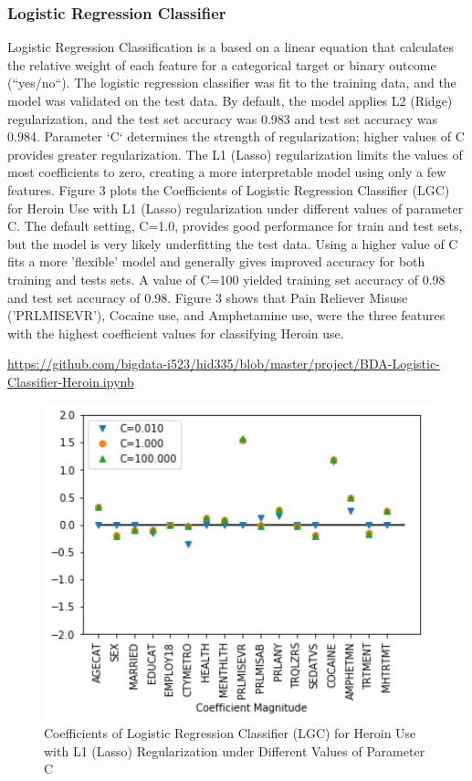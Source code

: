 \documentclass[sigconf]{acmart}
\begin{document}
\subsubsection{Logistic Regression Classifier}
Logistic Regression Classification is a based on a linear equation that 
calculates the relative weight of each feature for a categorical target or 
binary outcome (``yes/no``). The logistic regression classifier was fit to 
the training data, and the model was validated on the test data. By default, 
the model applies L2 (Ridge) regularization, and the test set accuracy 
was 0.983 and test set accuracy was 0.984. Parameter `C` determines the 
strength of regularization; higher values of C provides greater regularization. 
The L1 (Lasso) regularization limits the values of most coefficients to zero, 
creating a more interpretable model using only a few features. Figure 3 plots 
the Coefficients of Logistic Regression Classifier (LGC) for Heroin Use with 
L1 (Lasso) regularization under different values of parameter C. The default 
setting, C=1.0, provides good performance for train and test sets, but the 
model is very likely underfitting the test data. Using a higher value of C 
fits a more 'flexible' model and generally gives improved accuracy for both 
training and tests sets. A value of C=100 yielded training set accuracy of
0.98 and test set accuracy of 0.98. Figure 3 shows that Pain Reliever Misuse
('PRLMISEVR'), Cocaine use, and Amphetamine use, were the three features
with the highest coefficient values for classifying Heroin use. 

\url{https://github.com/bigdata-i523/hid335/blob/master/project/BDA-Logistic-Classifier-Heroin.ipynb}

\begin{figure}[!ht]
  \centering\includegraphics[width=\columnwidth]{images/Figure3.pdf}
  \caption{Coefficients of Logistic Regression Classifier (LGC) for Heroin Use 
  with L1 (Lasso) Regularization under Different Values of Parameter C}
  \label{f:Figure3}
\end{figure}
\end{document}
